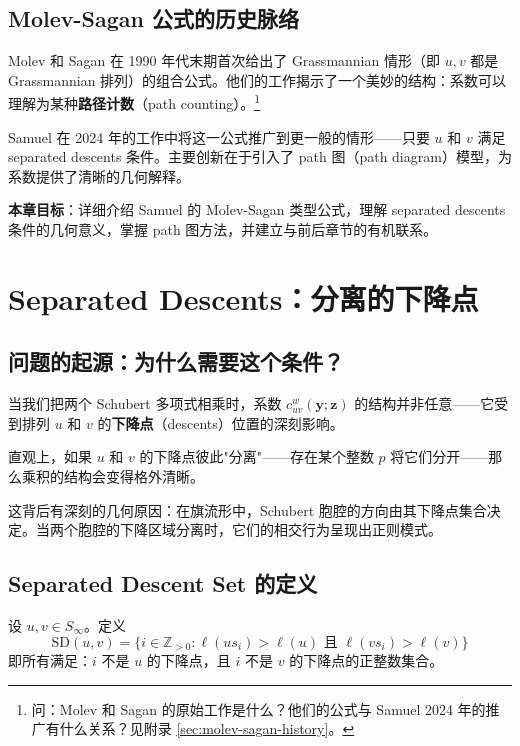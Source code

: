 \subsection{Molev-Sagan 公式的历史脉络}

Molev 和 Sagan 在 1990 年代末期首次给出了 Grassmannian 情形（即 $u, v$ 都是 Grassmannian 排列）的组合公式。他们的工作揭示了一个美妙的结构：系数可以理解为某种\textbf{路径计数}（path counting）。\footnote{问：Molev 和 Sagan 的原始工作是什么？他们的公式与 Samuel 2024 年的推广有什么关系？见附录 \cref{sec:molev-sagan-history}。}

Samuel 在 2024 年的工作中将这一公式推广到更一般的情形——只要 $u$ 和 $v$ 满足 separated descents 条件。主要创新在于引入了 path 图（path diagram）模型，为系数提供了清晰的几何解释。

\textbf{本章目标}：详细介绍 Samuel 的 Molev-Sagan 类型公式，理解 separated descents 条件的几何意义，掌握 path 图方法，并建立与前后章节的有机联系。

\section{Separated Descents：分离的下降点}
\label{sec:SeparatedDescents}

\subsection{问题的起源：为什么需要这个条件？}

当我们把两个 Schubert 多项式相乘时，系数 $c_{uv}^w(\mathbf{y}; \mathbf{z})$ 的结构并非任意——它受到排列 $u$ 和 $v$ 的\textbf{下降点}（descents）位置的深刻影响。

直观上，如果 $u$ 和 $v$ 的下降点彼此"分离"——存在某个整数 $p$ 将它们分开——那么乘积的结构会变得格外清晰。

这背后有深刻的几何原因：在旗流形中，Schubert 胞腔的方向由其下降点集合决定。当两个胞腔的下降区域分离时，它们的相交行为呈现出正则模式。

\subsection{Separated Descent Set 的定义}

\begin{Definition}
\label{def:SDuv}
设 $u, v \in S_\infty$。定义
\begin{equation}
\mathrm{SD}(u, v) = \{ i \in \mathbb{Z}_{>0} : \ell(us_i) > \ell(u) \text{ 且 } \ell(vs_i) > \ell(v) \}
\label{eq:SD-def}
\end{equation}
即所有满足：$i$ 不是 $u$ 的下降点，且 $i$ 不是 $v$ 的下降点的正整数集合。
\end{Definition}

